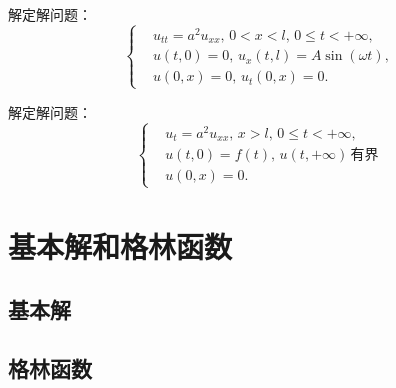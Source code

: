 \begin{problembox}
    \begin{exercise}
        解定解问题：
        \begin{equation*}
            \left\{
                \begin{aligned}
                    &u_{tt} = a^2 u_{xx},\, 0 < x < l,\, 0 \leq t < +\infty,\\
                    &u(t, 0) = 0,\, u_x(t, l) = A \sin(\omega t),\\
                    &u(0, x) = 0,\, u_t\left(0, x\right) = 0.
                \end{aligned}
            \right.
        \end{equation*}
    \end{exercise}
    \begin{exercise}
        解定解问题：
        \begin{equation*}
            \left\{
                \begin{aligned}
                    &u_{t} = a^2 u_{xx},\, x > l,\, 0 \leq t < +\infty,\\
                    &u(t, 0) = f(t),\, u(t, +\infty)\,\text{有界}\\
                    &u(0, x) = 0.
                \end{aligned}
            \right.
        \end{equation*}
    \end{exercise}
\end{problembox}

\section{基本解和格林函数}
\subsection{基本解}
\subsection{格林函数}